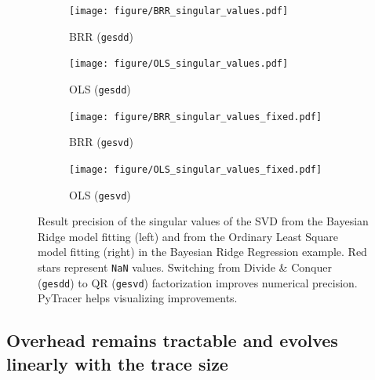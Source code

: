 \documentclass[10pt,journal,compsoc]{IEEEtran}
\begin{document}
\begin{figure}
    \centering
    \begin{subfigure}{0.49\linewidth}
        \texttt{[image: figure/BRR\_singular\_values.pdf]}
        \caption{BRR (\texttt{gesdd})}
        \label{fig:BRR_svd}
    \end{subfigure}
    \begin{subfigure}{0.49\linewidth}
        \texttt{[image: figure/OLS\_singular\_values.pdf]}
        \caption{OLS (\texttt{gesdd})}
        \label{fig:OLS_svd}
    \end{subfigure}
    \begin{subfigure}{0.49\linewidth}
        \texttt{[image: figure/BRR\_singular\_values\_fixed.pdf]}
        \caption{BRR (\texttt{gesvd})}
        \label{fig:BRR_svd_fixed}
    \end{subfigure}
    \begin{subfigure}{0.49\linewidth}
        \texttt{[image: figure/OLS\_singular\_values\_fixed.pdf]}
        \caption{OLS (\texttt{gesvd})}
        \label{fig:OLS_svd_fixed}
    \end{subfigure}
    \caption{Result precision of the singular values of the SVD from the
        Bayesian Ridge model fitting (left) and from the Ordinary Least Square
        model fitting (right) in the Bayesian Ridge Regression example. Red
        stars represent \texttt{NaN} values. Switching from Divide \& Conquer
        (\texttt{gesdd}) to QR (\texttt{gesvd}) factorization improves numerical
        precision. PyTracer helps visualizing improvements.}
\end{figure}

\subsection{Overhead remains tractable and evolves linearly with the trace size}
\end{document}
